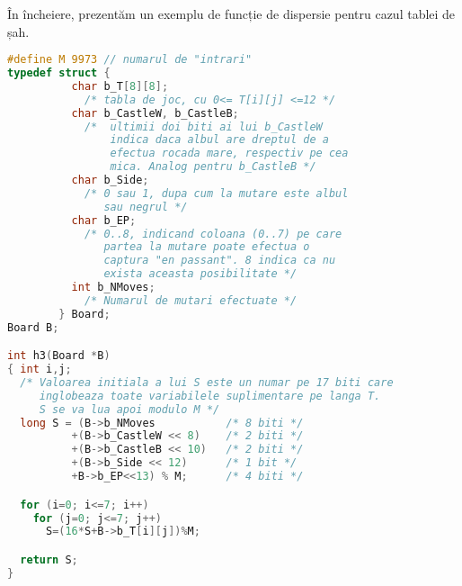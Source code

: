 În încheiere, prezentăm un exemplu de funcție de dispersie pentru cazul tablei
de șah.

\begin{lstlisting}[language=C]
#define M 9973 // numarul de "intrari"
typedef struct {
          char b_T[8][8];
            /* tabla de joc, cu 0<= T[i][j] <=12 */
          char b_CastleW, b_CastleB;
            /*  ultimii doi biti ai lui b_CastleW
                indica daca albul are dreptul de a
                efectua rocada mare, respectiv pe cea
                mica. Analog pentru b_CastleB */
          char b_Side;
            /* 0 sau 1, dupa cum la mutare este albul
               sau negrul */
          char b_EP;
            /* 0..8, indicand coloana (0..7) pe care
               partea la mutare poate efectua o
               captura "en passant". 8 indica ca nu
               exista aceasta posibilitate */
          int b_NMoves;
            /* Numarul de mutari efectuate */
        } Board;
Board B;

int h3(Board *B)
{ int i,j;
  /* Valoarea initiala a lui S este un numar pe 17 biti care
     inglobeaza toate variabilele suplimentare pe langa T.
     S se va lua apoi modulo M */
  long S = (B->b_NMoves           /* 8 biti */
          +(B->b_CastleW << 8)    /* 2 biti */
          +(B->b_CastleB << 10)   /* 2 biti */
          +(B->b_Side << 12)      /* 1 bit */
          +B->b_EP<<13) % M;      /* 4 biti */

  for (i=0; i<=7; i++)
    for (j=0; j<=7; j++)
      S=(16*S+B->b_T[i][j])%M;

  return S;
}
\end{lstlisting}
